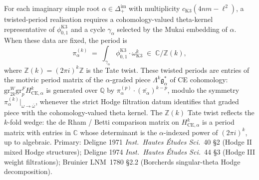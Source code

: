 \begin{remark}
\label{rem:cycat-ce-twisted-periods}
For each imaginary simple root $\alpha \in \Delta_+^{\mathrm{im}}$
with multiplicity $c_{\mathrm{K3}}(4nm-\ell^2)$, a twisted-period
realisation requires a cohomology-valued theta-kernel representative of
$\phi_{0,1}^{\mathrm{K3}}$ and a cycle $\gamma_\alpha$ selected by the
Mukai embedding of $\alpha$. When these data are fixed, the period is
\[
 \pi_\alpha^{(k)} \;=\;
 \int_{\gamma_\alpha} \phi_{0,1}^{\mathrm{K3}} \cdot \omega_{\mathrm{K3}}^{k}
 \;\in\; \mathbb{C}/\mathbb{Z}(k),
\]
where $\mathbb{Z}(k)=(2\pi i)^k\mathbb{Z}$ is the Tate twist. These
twisted periods are entries of the motivic period matrix of the
$\alpha$-graded piece $\Lambda^k \mathfrak{g}_\alpha^*$ of CE
cohomology: $\mathrm{gr}^W_{2k} \mathrm{gr}^F_p H^k_{\mathrm{CE},\alpha}$
is generated over $\mathbb{Q}$ by $\pi_\alpha^{(p)} \cdot
(\overline{\pi_\alpha})^{k-p}$, modulo the symmetry
$\pi_\alpha^{(k)}|_{\omega \to \bar\omega}$, whenever the strict
Hodge filtration datum identifies that graded piece with the
cohomology-valued theta kernel. The $\mathbb{Z}(k)$
Tate twist reflects the $k$-fold wedge: the de Rham / Betti
comparison matrix on $H^k_{\mathrm{CE},\alpha}$ is a period matrix
with entries in $\mathbb{C}$ whose determinant is the
$\alpha$-indexed power of $(2\pi i)^{k}$, up to algebraic.
Primary: Deligne 1971 \emph{Inst.\ Hautes \'Etudes Sci.}~40 \S 2
(Hodge II mixed Hodge structures); Deligne 1974
\emph{Inst.\ Hautes \'Etudes Sci.}~44 \S 3 (Hodge III weight filtrations);
Bruinier LNM~1780 \S 2.2 (Borcherds singular-theta Hodge
decomposition).
\end{remark}

